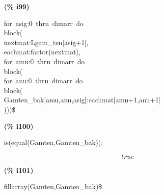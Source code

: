 \documentclass[fleqn]{article}
\begin{document}
\noindent
\begin{minipage}[t]{4.000000em}\color{red}\bfseries
(\% i99)	
\end{minipage}
\begin{minipage}[t]{\textwidth}\color{blue}
for\ asig:0\ thru\ dimarr\ do\\
block(\\
nextmat:Lgam\_ten[asig+1],\\
eachmat:factor(nextmat),\\
for\ amu:0\ thru\ dimarr\ do\\
block(\\
for\ anu:0\ thru\ dimarr\ do\\
block(\\
Gamten\_bak[amu,anu,asig]:eachmat[amu+1,anu+1]\\
)))\$
\end{minipage}

\noindent%



\noindent
\begin{minipage}[t]{4.000000em}\color{red}\bfseries
(\% i100)	
\end{minipage}
\begin{minipage}[t]{\textwidth}\color{blue}
is(equal(Gamten,Gamten\_bak));
\end{minipage}
\[\displaystyle \tag{\% o100} 
true\mbox{}
\]


\noindent
\begin{minipage}[t]{4.000000em}\color{red}\bfseries
(\% i101)	
\end{minipage}
\begin{minipage}[t]{\textwidth}\color{blue}
fillarray(Gamten,Gamten\_bak)\$
\end{minipage}

\noindent%
\end{document}
